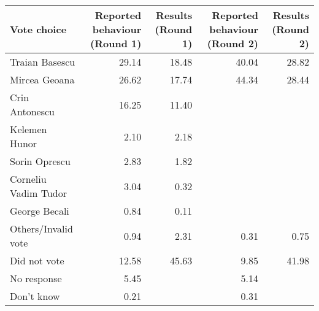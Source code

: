 
\begin{tabular}{l|rr|rr}
\hline
Vote choice & Reported behaviour (Round 1) & Results (Round 1) & Reported behaviour (Round 2) & Results (Round 2)\\
\hline
Traian Basescu & 29.14 & 18.48 & 40.04 & 28.82\\
Mircea Geoana & 26.62 & 17.74 & 44.34 & 28.44\\
Crin Antonescu & 16.25 & 11.40 &  & \\
Kelemen Hunor & 2.10 & 2.18 &  & \\
Sorin Oprescu & 2.83 & 1.82 &  & \\
Corneliu Vadim Tudor & 3.04 & 0.32 &  & \\
George Becali & 0.84 & 0.11 &  & \\
Others/Invalid vote & 0.94 & 2.31 & 0.31 & 0.75\\
Did not vote & 12.58 & 45.63 & 9.85 & 41.98\\
No response & 5.45 &  & 5.14 & \\
Don't know & 0.21 &  & 0.31 & \\
\hline
\end{tabular}
